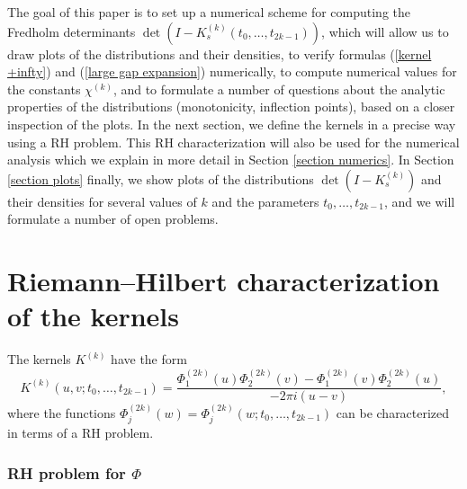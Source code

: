 \documentclass[11pt,fleqn]{article}
\numberwithin{equation}{section}
\begin{document}
The goal of this paper is to set up a numerical scheme for computing the Fredholm determinants
$\det(I-K_s^{(k)}(t_0,\dots,t_{2k-1}))$, which will allow us to draw plots of the
distributions and their densities, to
 verify formulas (\ref{kernel +infty})
and (\ref{large gap expansion}) numerically, to compute numerical
values for the constants $\chi^{(k)}$, and to formulate a number of questions about the
analytic properties of the distributions (monotonicity, inflection points), based on a closer
inspection of the plots. In the next section, we define the kernels
in a precise way using a RH problem. This
RH characterization will also be used for the numerical analysis
which we explain in more detail in Section \ref{section numerics}.
In Section \ref{section plots} finally, we show plots of the
distributions $\det(I-K_s^{(k)})$ and their densities for several
values of $k$ and the parameters $t_0, \ldots, t_{2k-1}$, and we
will formulate a number of open problems.


\section{Riemann--Hilbert characterization of the kernels}
The kernels $K^{(k)}$ have the form
\begin{equation}\label{kernel2}
K^{(k)}(u,v;t_0, \ldots , t_{2k-1})=\frac{\Phi_1^{(2k)}(u)\Phi_2^{(2k)}(v)-\Phi_1^{(2k)}(v)\Phi_2^{(2k)}(u)}{-2\pi i(u-v)},
\end{equation}
where the functions
$\Phi_j^{(2k)}(w)=\Phi_j^{(2k)}(w;t_0,\ldots,t_{2k-1})$ can be characterized in terms of a RH problem.

\subsubsection*{RH problem for $\Phi$}
\end{document}
